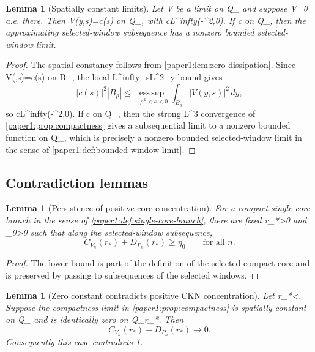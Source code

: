 \documentclass[11pt]{amsart}
\def\({}%
\def\){}%
\def\infty{infty}%
\theoremstyle{plain}
\newtheorem{lemma}[theorem]{Lemma}
\theoremstyle{definition}
\theoremstyle{remark}
\begin{document}
\begin{lemma}[Spatially constant limits]\label{paper1:lem:constant-limit}
Let \(V\) be a limit on \(Q_\rho\) and suppose \(\nabla V=0\) a.e. there.
Then \(V(y,s)=c(s)\) on \(Q_\rho\), with
\(c\in L^\infty(-\rho^2,0)\).  If \(c\not{}\) on \(Q_\rho\), then
the approximating selected-window subsequence has a nonzero bounded
selected-window limit.
\end{lemma}

\begin{proof}
The spatial constancy follows from \cref{paper1:lem:zero-dissipation}.  Since
\(V(\cdot,s)=c(s)\) on \(B_\rho\), the local \(L^\infty_sL^2_y\) bound gives
\[
  |c(s)|^2|B_\rho|\le \operatorname*{ess\,sup}_{-\rho^2<s<0}
  \int_{B_\rho}|V(y,s)|^2\,dy,
\]
so \(c\in L^\infty(-\rho^2,0)\).  If \(c\not{}\) on \(Q_\rho\), then the
strong \(L^3\) convergence of \cref{paper1:prop:compactness} gives a subsequential
limit to a nonzero bounded function on \(Q_\rho\), which is precisely a nonzero
bounded selected-window limit in the sense of \cref{paper1:def:bounded-window-limit}.
\end{proof}

\subsection{Contradiction lemmas}

\begin{lemma}[Persistence of positive core concentration]\label{paper1:lem:persistence}
For a compact single-core branch in the sense of \cref{paper1:def:single-core-branch},
there are fixed \(r_*>0\) and \(\eta_0>0\) such that along the selected-window
subsequence,
\[
  C_{V_n}(r_*)+D_{P_n}(r_*)\ge\eta_0
  \qquad\text{for all }n.
\]
\end{lemma}

\begin{proof}
The lower bound is part of the definition of the selected compact core and is preserved by
passing to subsequences of the selected windows.
\end{proof}

\begin{lemma}[Zero constant contradicts positive CKN concentration]\label{paper1:lem:zero-contradiction}
Let \(r_*<\rho\).  Suppose the compactness limit in \cref{paper1:prop:compactness} is
spatially constant on \(Q_\rho\) and is identically zero on \(Q_{r_*}\).  Then
\[
  C_{V_n}(r_*)+D_{P_n}(r_*)\to0.
\]
Consequently this case contradicts \cref{paper1:lem:persistence}.
\end{lemma}
\end{document}
